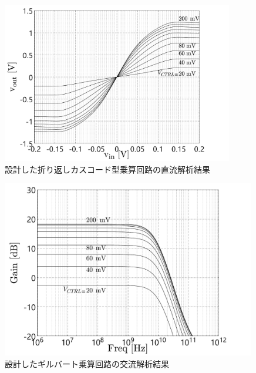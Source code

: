         \begin{figure}[!b]
            \centering
            \includegraphics[width=0.9\textwidth]{figures/chapter3/folded_mirror_dc_com.pdf}
            \caption{設計した折り返しカスコード型乗算回路の直流解析結果}
            \label{fig:3_folded_mirror_dc_com}
        \end{figure}
        \begin{figure}[!b]
            \centering
            \includegraphics[width=0.99\textwidth]{figures/chapter3/previous_ac_com.pdf}
            \caption{設計したギルバート乗算回路の交流解析結果}
            \label{fig:3_previous_ac_com}
        \end{figure}
